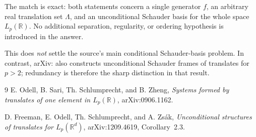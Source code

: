 \documentclass[11pt]{amsart}
\begin{document}
The match is exact: both statements concern a single generator $f$, an
arbitrary real translation set $\Lambda$, and an unconditional Schauder
basis for the whole space $L_p(\mathbb R)$.  No additional separation,
regularity, or ordering hypothesis is introduced in the answer.

This does \emph{not} settle the source's main conditional Schauder-basis
problem.  In contrast, arXiv: also constructs unconditional
Schauder frames of translates for $p>2$; redundancy is therefore the sharp
distinction in that result.

\enlargethispage{5\baselineskip}
\small
\begin{thebibliography}{9}
E. Odell, B. Sari, Th. Schlumprecht, and B. Zheng,
\emph{Systems formed by translates of one element in $L_p(\mathbb R)$},
arXiv:0906.1162.

D. Freeman, E. Odell, Th. Schlumprecht, and A. Zs\'ak,
\emph{Unconditional structures of translates for $L_p(\mathbb R^d)$},
arXiv:1209.4619, Corollary~2.3.
\end{thebibliography}
\end{document}
